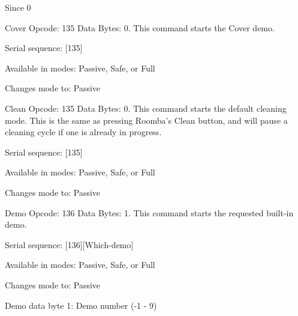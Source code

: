 \begin{Desc}
\begin{description}
\begin{DoxySince}{Since}
0 
\end{DoxySince}
\item[{\em 
\hypertarget{group__roomba-lib_gga305e17dfb7050ad83ea49ded2e6a2e24abfb77b700185666cad669081837c6bff}{}R\+O\+O\+M\+B\+A\+\_\+\+C\+O\+V\+E\+R\label{group__roomba-lib_gga305e17dfb7050ad83ea49ded2e6a2e24abfb77b700185666cad669081837c6bff}
}]Cover Opcode\+: 135 Data Bytes\+: 0. This command starts the Cover demo.
\begin{DoxyItemize}
\item Serial sequence\+: \mbox{[}135\mbox{]}
\item Available in modes\+: Passive, Safe, or Full
\item Changes mode to\+: Passive 
\end{DoxyItemize}\item[{\em 
\hypertarget{group__roomba-lib_gga305e17dfb7050ad83ea49ded2e6a2e24abed3f4709f037352df127ea6b5e45acd}{}R\+O\+O\+M\+B\+A\+\_\+\+C\+L\+E\+A\+N\label{group__roomba-lib_gga305e17dfb7050ad83ea49ded2e6a2e24abed3f4709f037352df127ea6b5e45acd}
}]Clean Opcode\+: 135 Data Bytes\+: 0. This command starts the default cleaning mode. This is the same as pressing Roomba’s Clean button, and will pause a cleaning cycle if one is already in progress.
\begin{DoxyItemize}
\item Serial sequence\+: \mbox{[}135\mbox{]}
\item Available in modes\+: Passive, Safe, or Full
\item Changes mode to\+: Passive 
\end{DoxyItemize}\item[{\em 
\hypertarget{group__roomba-lib_gga305e17dfb7050ad83ea49ded2e6a2e24a4009137101f5f5008ebb98e6bb7c3436}{}R\+O\+O\+M\+B\+A\+\_\+\+D\+E\+M\+O\label{group__roomba-lib_gga305e17dfb7050ad83ea49ded2e6a2e24a4009137101f5f5008ebb98e6bb7c3436}
}]Demo Opcode\+: 136 Data Bytes\+: 1. This command starts the requested built-\/in demo.
\begin{DoxyItemize}
\item Serial sequence\+: \mbox{[}136\mbox{]}\mbox{[}Which-\/demo\mbox{]}
\item Available in modes\+: Passive, Safe, or Full
\item Changes mode to\+: Passive
\item Demo data byte 1\+: Demo number (-\/1 -\/ 9)
\end{DoxyItemize}


\end{description}
\end{Desc}

